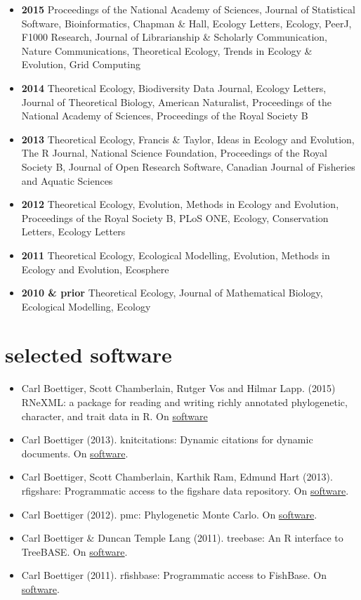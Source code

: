 \documentclass[11pt,a4paper,sans]{moderncv}        %
\providecommand{\tightlist}{%
    \setlength{\itemsep}{0pt}\setlength{\parskip}{0pt}}
\begin{document}
\begin{itemize}
\item
  \textbf{2015} Proceedings of the National Academy of Sciences, Journal
  of Statistical Software, Bioinformatics, Chapman \& Hall, Ecology
  Letters, Ecology, PeerJ, F1000 Research, Journal of Librarianship \&
  Scholarly Communication, Nature Communications, Theoretical Ecology,
  Trends in Ecology \& Evolution, Grid Computing
\item
  \textbf{2014} Theoretical Ecology, Biodiversity Data Journal, Ecology
  Letters, Journal of Theoretical Biology, American Naturalist,
  Proceedings of the National Academy of Sciences, Proceedings of the
  Royal Society B
\item
  \textbf{2013} Theoretical Ecology, Francis \& Taylor, Ideas in Ecology
  and Evolution, The R Journal, National Science Foundation, Proceedings
  of the Royal Society B, Journal of Open Research Software, Canadian
  Journal of Fisheries and Aquatic Sciences
\item
  \textbf{2012} Theoretical Ecology, Evolution, Methods in Ecology and
  Evolution, Proceedings of the Royal Society B, PLoS ONE, Ecology,
  Conservation Letters, Ecology Letters
\item
  \textbf{2011} Theoretical Ecology, Ecological Modelling, Evolution,
  Methods in Ecology and Evolution, Ecosphere
\item
  \textbf{2010 \& prior} Theoretical Ecology, Journal of Mathematical
  Biology, Ecological Modelling, Ecology
\end{itemize}

\section{selected software}\label{selected-software}

\begin{itemize}
\tightlist
\item
  Carl Boettiger, Scott Chamberlain, Rutger Vos and Hilmar Lapp. (2015)
  RNeXML: a package for reading and writing richly annotated
  phylogenetic, character, and trait data in R. On
  \href{https://cran.rstudio.com/web/packages/RNeXML/}{software}
\item
  Carl Boettiger (2013). knitcitations: Dynamic citations for dynamic
  documents. On
  \href{http://cran.r-project.org/web/packages/knitcitations/}{software}.
\item
  Carl Boettiger, Scott Chamberlain, Karthik Ram, Edmund Hart (2013).
  rfigshare: Programmatic access to the figshare data repository. On
  \href{http://cran.r-project.org/web/packages/rfigshare/}{software}.
\item
  Carl Boettiger (2012). pmc: Phylogenetic Monte Carlo. On
  \href{https://cran.rstudio.com/web/packages/pmc/}{software}.
\item
  Carl Boettiger \& Duncan Temple Lang (2011). treebase: An R interface
  to TreeBASE. On
  \href{http://cran.r-project.org/web/packages/treebase/}{software}.
\item
  Carl Boettiger (2011). rfishbase: Programmatic access to FishBase. On
  \href{http://cran.r-project.org/web/packages/rfishbase/}{software}.
\end{itemize}
\end{document}
